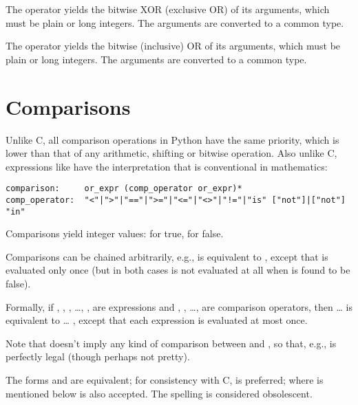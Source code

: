 The \code{\^} operator yields the bitwise XOR (exclusive OR) of its
arguments, which must be plain or long integers.  The arguments are
converted to a common type.

The \code{|} operator yields the bitwise (inclusive) OR of its
arguments, which must be plain or long integers.  The arguments are
converted to a common type.

\section{Comparisons\label{comparisons}}

Unlike C, all comparison operations in Python have the same priority,
which is lower than that of any arithmetic, shifting or bitwise
operation.  Also unlike C, expressions like  have the
interpretation that is conventional in mathematics:

\begin{verbatim}
comparison:     or_expr (comp_operator or_expr)*
comp_operator:  "<"|">"|"=="|">="|"<="|"<>"|"!="|"is" ["not"]|["not"] "in"
\end{verbatim}

Comparisons yield integer values:  for true,  for false.

Comparisons can be chained arbitrarily, e.g.,  is
equivalent to , except that  is
evaluated only once (but in both cases  is not evaluated at all
when  is found to be false).

Formally, if , , , \ldots, ,  are
expressions and , , \ldots,  are comparison
operators, then  \ldots {} is equivalent
to     \ldots
{}, except that each expression is evaluated at most once.

Note that  doesn't imply any kind of comparison
between  and , so that, e.g.,  is
perfectly legal (though perhaps not pretty).

The forms \code{<>} and \code{!=} are equivalent; for consistency with
C, \code{!=} is preferred; where \code{!=} is mentioned below
\code{<>} is also accepted.  The \code{<>} spelling is considered
obsolescent.

